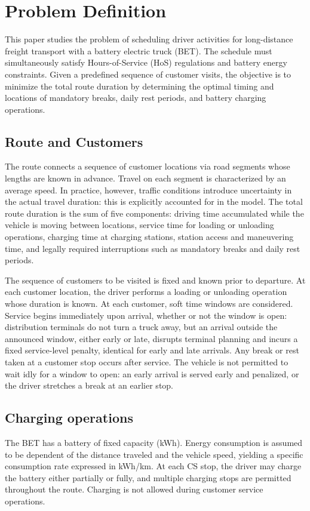 \documentclass[preprint,12pt,3p]{elsarticle}
\begin{document}
\section{Problem Definition}
\label{sec:problem_definition}

This paper studies the problem of scheduling driver activities for long-distance freight transport with a battery electric truck (BET). The schedule must simultaneously satisfy Hours-of-Service (HoS) regulations and battery energy constraints. Given a predefined sequence of customer visits, the objective is to minimize the total route duration by determining the optimal timing and locations of mandatory breaks, daily rest periods, and battery charging operations.

\subsection{Route and Customers}
The route connects a sequence of customer locations via road segments whose lengths are known in advance. Travel on each segment is characterized by an average speed. In practice, however, traffic conditions introduce uncertainty in the actual travel duration: this is explicitly accounted for in the model. The total route duration is the sum of five components: driving time accumulated while the vehicle is moving between locations, service time for loading or unloading operations, charging time at charging stations, station access and maneuvering time, and legally required interruptions such as mandatory breaks and daily rest periods.

The sequence of customers to be visited is fixed and known prior to departure. At each customer location, the driver performs a loading or unloading operation whose duration is known.
At each customer, soft time windows are considered. Service begins immediately upon arrival, whether or not the window is open: distribution terminals do not turn a truck away, but an arrival outside the announced window, either early or late, disrupts terminal planning and incurs a fixed service-level penalty, identical for early and late arrivals. Any break or rest
taken at a customer stop occurs after service. The vehicle is not permitted to wait idly for a window to open: an early arrival is served early and penalized, or the driver stretches a break at an earlier stop.

\subsection{Charging operations}
The BET has a battery of fixed capacity (kWh). Energy consumption is assumed to be dependent of the distance traveled and the vehicle speed, yielding a specific consumption rate expressed in kWh/km. At each CS stop, the driver may charge the battery either partially or fully, and multiple charging stops are permitted throughout the route. Charging is not allowed during customer service operations.
\end{document}
